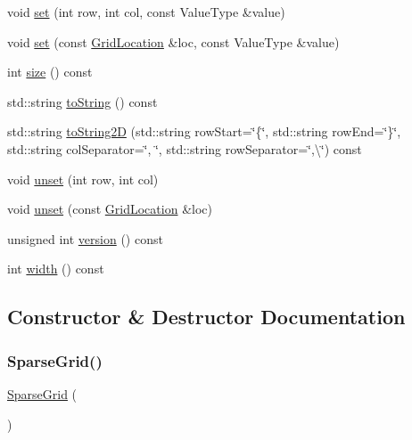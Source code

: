\begin{DoxyCompactItemize}
$$\item 
void \mbox{\hyperlink{classSparseGrid_a6f5cee26d171f36d280a15c51332efc2}{set}} (int row, int col, const Value\+Type \&value)
\item 
void \mbox{\hyperlink{classSparseGrid_a02a61287a9aee6a1ff7e8a8325ce094d}{set}} (const \mbox{\hyperlink{structGridLocation}{Grid\+Location}} \&loc, const Value\+Type \&value)
\item 
int \mbox{\hyperlink{classSparseGrid_af9593d4a5ff4274efaf429cb4f9e57cc}{size}} () const
\item 
std\+::string \mbox{\hyperlink{classSparseGrid_a1fe5121d6528fdea3f243321b3fa3a49}{to\+String}} () const
\item 
std\+::string \mbox{\hyperlink{classSparseGrid_a8e636ad8b56218c7e0162d6c1bd78b39}{to\+String2D}} (std\+::string row\+Start=\char`\"{}\{\char`\"{}, std\+::string row\+End=\char`\"{}\}\char`\"{}, std\+::string col\+Separator=\char`\"{}, \char`\"{}, std\+::string row\+Separator=\char`\"{},\textbackslash{}\char`\"{}) const
\item 
void \mbox{\hyperlink{classSparseGrid_ae8cd7ce6866d5bccb4d900047b00a9f0}{unset}} (int row, int col)
\item 
void \mbox{\hyperlink{classSparseGrid_a6c6a0cedc17fead9553340c164db6eb3}{unset}} (const \mbox{\hyperlink{structGridLocation}{Grid\+Location}} \&loc)
\item 
unsigned int \mbox{\hyperlink{classSparseGrid_a0aa696ccb72cbf928535d6b646bac1aa}{version}} () const
\item 
int \mbox{\hyperlink{classSparseGrid_ad72663daf610f2a0833a2fc3d78e4fdf}{width}} () const
\end{DoxyCompactItemize}


\subsection{Constructor \& Destructor Documentation}
\mbox{\label{classSparseGrid_aa3e62bd1aaaaaa299dd7679cf577c1bd}} 
\subsubsection{\texorpdfstring{Sparse\+Grid()}{SparseGrid()}\hspace{0.1cm}{\footnotesize\ttfamily [1/5]}}
{\footnotesize\ttfamily \mbox{\hyperlink{classSparseGrid}{Sparse\+Grid}} (\begin{DoxyParamCaption}{ }\end{DoxyParamCaption})}


